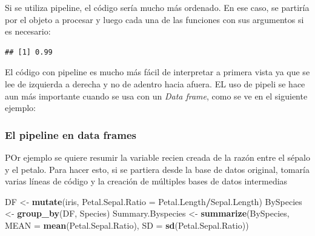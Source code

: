 \documentclass[]{book}
\newenvironment{Shaded}{\begin{snugshade}}{\end{snugshade}}
\newcommand{\DataTypeTok}[1]{\textcolor[rgb]{0.13,0.29,0.53}{#1}}
\newcommand{\DecValTok}[1]{\textcolor[rgb]{0.00,0.00,0.81}{#1}}
\newcommand{\KeywordTok}[1]{\textcolor[rgb]{0.13,0.29,0.53}{\textbf{#1}}}
\newcommand{\NormalTok}[1]{#1}
\newcommand{\OperatorTok}[1]{\textcolor[rgb]{0.81,0.36,0.00}{\textbf{#1}}}
\newcommand{\StringTok}[1]{\textcolor[rgb]{0.31,0.60,0.02}{#1}}
\begin{document}
Si se utiliza pipeline, el código sería mucho más ordenado. En ese caso,
se partiría por el objeto a procesar y luego cada una de las funciones
con sus argumentos si es necesario:

\begin{Shaded}
\end{Shaded}

\begin{verbatim}
## [1] 0.99
\end{verbatim}

El código con pipeline es mucho más fácil de interpretar a primera vista
ya que se lee de izquierda a derecha y no de adentro hacia afuera. EL
uso de pipeli se hace aun más importante cuando se usa con un \emph{Data
frame}, como se ve en el siguiente ejemplo:

\hypertarget{el-pipeline-en-data-frames}{%
\subsubsection{El pipeline en data
frames}\label{el-pipeline-en-data-frames}}

POr ejemplo se quiere resumir la variable recien creada de la razón
entre el sépalo y el petalo. Para hacer esto, si se partiera desde la
base de datos original, tomaría varias líneas de código y la creación de
múltiples bases de datos intermedias

\begin{Shaded}
\begin{Highlighting}[]
\NormalTok{DF <-}\StringTok{ }\KeywordTok{mutate}\NormalTok{(iris, }\DataTypeTok{Petal.Sepal.Ratio =}\NormalTok{ Petal.Length}\OperatorTok{/}\NormalTok{Sepal.Length)}
\NormalTok{BySpecies <-}\StringTok{ }\KeywordTok{group_by}\NormalTok{(DF, Species)}
\NormalTok{Summary.Byspecies <-}\StringTok{ }\KeywordTok{summarize}\NormalTok{(BySpecies, }\DataTypeTok{MEAN =} \KeywordTok{mean}\NormalTok{(Petal.Sepal.Ratio), }
    \DataTypeTok{SD =} \KeywordTok{sd}\NormalTok{(Petal.Sepal.Ratio))}
\end{Highlighting}
\end{Shaded}
\end{document}

